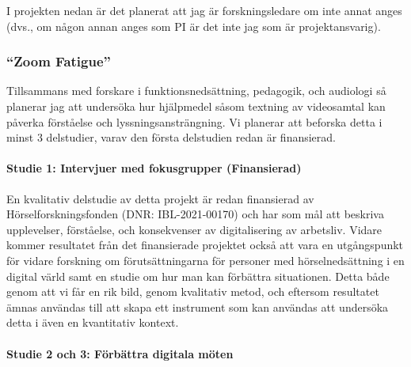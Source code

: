 \documentclass[]{article}
\begin{document}
I projekten nedan är det planerat att jag är forskningsledare om inte
annat anges (dvs., om någon annan anges som PI är det inte jag som är
projektansvarig).

\hypertarget{zoom-fatigue}{%
\subsubsection{``Zoom Fatigue''}\label{zoom-fatigue}}

Tillsammans med forskare i funktionsnedsättning, pedagogik, och
audiologi så planerar jag att undersöka hur hjälpmedel såsom textning av
videosamtal kan påverka förståelse och lyssningsansträngning. Vi
planerar att beforska detta i minst 3 delstudier, varav den första
delstudien redan är finansierad.

\hypertarget{studie-1-intervjuer-med-fokusgrupper-finansierad}{%
\paragraph{Studie 1: Intervjuer med fokusgrupper
(Finansierad)}\label{studie-1-intervjuer-med-fokusgrupper-finansierad}}

En kvalitativ delstudie av detta projekt är redan finansierad av
Hörselforskningsfonden (DNR: IBL-2021-00170) och har som mål att
beskriva upplevelser, förståelse, och konsekvenser av digitalisering av
arbetsliv. Vidare kommer resultatet från det finansierade projektet
också att vara en utgångspunkt för vidare forskning om förutsättningarna
för personer med hörselnedsättning i en digital värld samt en studie om
hur man kan förbättra situationen. Detta både genom att vi får en rik
bild, genom kvalitativ metod, och eftersom resultatet ämnas användas
till att skapa ett instrument som kan användas att undersöka detta i
även en kvantitativ kontext.

\hypertarget{studie-2-och-3-fuxf6rbuxe4ttra-digitala-muxf6ten}{%
\paragraph{Studie 2 och 3: Förbättra digitala
möten}\label{studie-2-och-3-fuxf6rbuxe4ttra-digitala-muxf6ten}}
\end{document}

